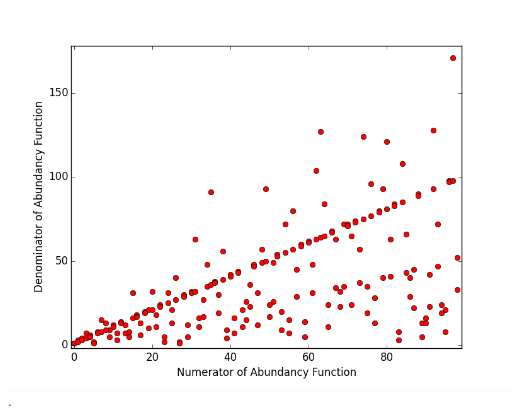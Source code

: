 \documentclass[11pt]{article}
\begin{document}
\includegraphics[scale=0.5]{num_vs_denom_1_to_100.png}.
\end{document}
